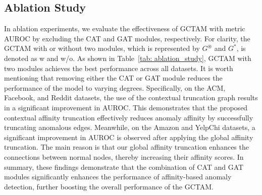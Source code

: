 \documentclass{article}
\begin{document}
\subsection{Ablation Study}



In ablation experiments, we evaluate the effectiveness of GCTAM with metric AUROC by excluding the CAT and GAT modules, respectively. For clarity, the GCTAM with or without two modules, which is represented by $G^{\circledast}$ and $G^{*}$, is denoted as w and w/o. As shown in Table~\ref{tab: ablation_study}, GCTAM with two modules achieves the best performance across all datasets. It is worth mentioning that removing either the CAT or GAT module reduces the performance of the model to varying degrees. Specifically, on the ACM, Facebook, and Reddit datasets, the use of the contextual truncation graph results in a significant improvement in AUROC. This demonstrates that the proposed contextual affinity truncation effectively reduces anomaly affinity by successfully truncating anomalous edges. Meanwhile, on the Amazon and YelpChi datasets, a significant improvement in AUROC is observed after applying the global affinity truncation. The main reason is that our global affinity truncation enhances the connections between normal nodes, thereby increasing their affinity scores. In summary, these findings demonstrate that the combination of CAT and GAT modules significantly enhances the performance of affinity-based anomaly detection, further boosting the overall performance of the GCTAM.
\end{document}
